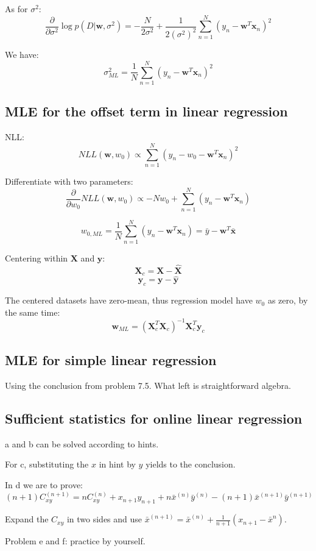 \documentclass[UTF8]{ctexart}
\begin{document}
As for $\sigma^{2}$:
$$\frac{\partial}{\partial \sigma^{2}}\log p(D|\textbf{w},\sigma^{2}) = -\frac{N}{2\sigma^{2}}+\frac{1}{2(\sigma^{2})^{2}}\sum_{n=1}^{N}(y_{n}-\textbf{w}^{T}\textbf{x}_{n})^{2}$$

We have:
$$\sigma^{2}_{ML}=\frac{1}{N}\sum_{n=1}^{N}(y_{n}-\textbf{w}^{T}\textbf{x}_{n})^{2}$$

\subsection{MLE for the offset term in linear regression}
NLL:
$$NLL(\textbf{w},w_{0})\propto \sum_{n=1}^{N}(y_{n}-w_{0}-\textbf{w}^{T}\textbf{x}_{n})^{2}$$

Differentiate with two parameters:
$$\frac{\partial}{\partial w_{0}}NLL(\textbf{w},w_{0}) \propto -Nw_{0} +\sum_{n=1}^{N}(y_{n}-\textbf{w}^{T}\textbf{x}_{n})$$

$$w_{0,ML}=\frac{1}{N} \sum_{n=1}^{N}(y_{n}-\textbf{w}^{T}\textbf{x}_{n})=\bar{y}-\textbf{w}^{T}\bar{\textbf{x}}$$

Centering within $\textbf{X}$ and $\textbf{y}$:
$$\textbf{X}_{c}=\textbf{X}-\hat{\textbf{X}}$$
$$\textbf{y}_{c}=\textbf{y}-\hat{\textbf{y}}$$

The centered datasets have zero-mean, thus regression model have $w_{0}$ as zero, by the same time:
$$\textbf{w}_{ML}=(\textbf{X}_{c}^{T}\textbf{X}_{c})^{-1}\textbf{X}_{c}^{T}\textbf{y}_{c}$$

\subsection{MLE for simple linear regression}
Using the conclusion from problem 7.5. What left is straightforward algebra.

\subsection{Sufficient statistics for online linear regression}
a and b can be solved according to hints.

For c, substituting the $x$ in hint by $y$ yields to the conclusion.

In d we are to prove:
$$(n+1)C_{xy}^{(n+1)}=nC_{xy}^{(n)}+x_{n+1}y_{n+1}+n\bar{x}^{(n)}\bar{y}^{(n)}-(n+1)\bar{x}^{(n+1)}\bar{y}^{(n+1)}$$

Expand the $C_{xy}$ in two sides and use $\bar{x}^{(n+1)}=\bar{x}^{(n)}+\frac{1}{n+1}(x_{n+1}-\bar{x}^{n})$.

Problem e and f: practice by yourself.
\end{document}
